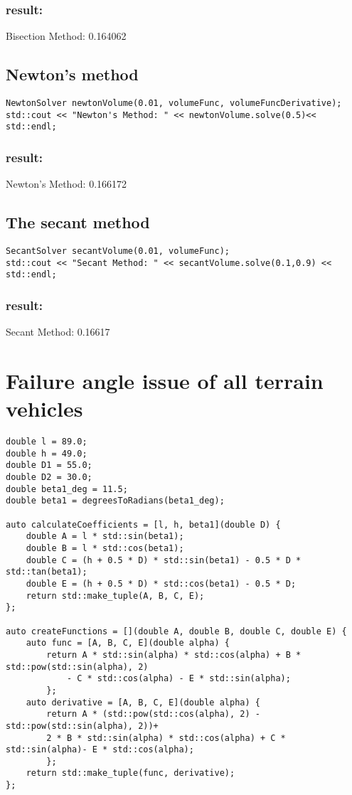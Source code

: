 \documentclass[a4paper]{article}
\begin{document}
\subsubsection*{result:}
Bisection Method: 0.164062
\subsection{Newton's method}
\begin{lstlisting}
NewtonSolver newtonVolume(0.01, volumeFunc, volumeFuncDerivative);
std::cout << "Newton's Method: " << newtonVolume.solve(0.5)<< std::endl;
\end{lstlisting}
\subsubsection*{result:}
Newton's Method: 0.166172
\subsection{The secant method}
\begin{lstlisting}
SecantSolver secantVolume(0.01, volumeFunc);
std::cout << "Secant Method: " << secantVolume.solve(0.1,0.9) << std::endl;
\end{lstlisting}
\subsubsection*{result:}
Secant Method: 0.16617
\section{Failure angle issue of all terrain vehicles}
\begin{lstlisting}
double l = 89.0;
double h = 49.0;
double D1 = 55.0;
double D2 = 30.0;
double beta1_deg = 11.5;
double beta1 = degreesToRadians(beta1_deg);

auto calculateCoefficients = [l, h, beta1](double D) {
    double A = l * std::sin(beta1);
    double B = l * std::cos(beta1);
    double C = (h + 0.5 * D) * std::sin(beta1) - 0.5 * D * std::tan(beta1);
    double E = (h + 0.5 * D) * std::cos(beta1) - 0.5 * D;
    return std::make_tuple(A, B, C, E);
};

auto createFunctions = [](double A, double B, double C, double E) {
    auto func = [A, B, C, E](double alpha) {
        return A * std::sin(alpha) * std::cos(alpha) + B * std::pow(std::sin(alpha), 2)
            - C * std::cos(alpha) - E * std::sin(alpha);
        };
    auto derivative = [A, B, C, E](double alpha) {
        return A * (std::pow(std::cos(alpha), 2) - std::pow(std::sin(alpha), 2))+ 
        2 * B * std::sin(alpha) * std::cos(alpha) + C * std::sin(alpha)- E * std::cos(alpha);
        };
    return std::make_tuple(func, derivative);
};
\end{lstlisting}
\end{document}

